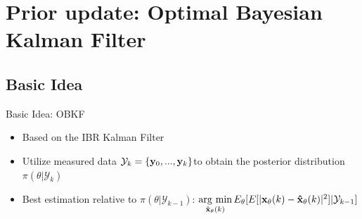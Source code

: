 \section{Prior update: Optimal Bayesian Kalman Filter}

\begin{frame}
    \tableofcontents[currentsection]
\end{frame}

\subsection{Basic Idea}
\begin{frame}{Basic Idea: OBKF}
    \begin{itemize}
        \item Based on the IBR Kalman Filter
        \item Utilize measured data $\mathcal{Y}_{k}=\{{\bf y}_0,...,{\bf y}_{k}\}$to obtain the posterior distribution $\pi(\theta|\mathcal{Y}_k)$
        \item Best estimation relative to $\pi(\theta|\mathcal{Y}_{k-1})$: $\mathop{\rm arg~min}\limits_{{\bf \hat x_\theta}(k)} E_\theta[E[|{\bf x_\theta}(k) - {\bf \hat x_\theta}(k)|^2]|\mathcal{Y}_{k-1}]$
    \end{itemize}
\end{frame}


